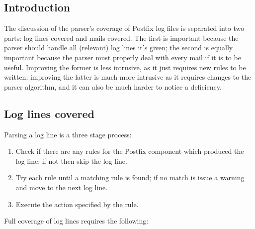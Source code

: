 \documentclass[a4paper,12pt,draft]{article}
\begin{document}
\subsection{Introduction}

The discussion of the parser's coverage of Postfix log files is separated
into two parts: log lines covered and mails covered.  The first is
important because the parser should handle all (relevant) log lines it's
given; the second is equally important because the parser must properly
deal with every mail if it is to be useful.  Improving the former is
less intrusive, as it just requires new rules to be written; improving the
latter is much more intrusive as it requires changes to the parser
algorithm, and it can also be much harder to notice a deficiency.

\subsection{Log lines covered}

\label{log-lines-covered}

Parsing a log line is a three stage process:

\begin{enumerate}

    \item Check if there are any rules for the Postfix component which
        produced the log line; if not then skip the log line.

    \item Try each rule until a matching rule is found; if no match is
        issue a warning and move to the next log line.

    \item Execute the action specified by the rule.

\end{enumerate}

Full coverage of log lines requires the following:
\end{document}
